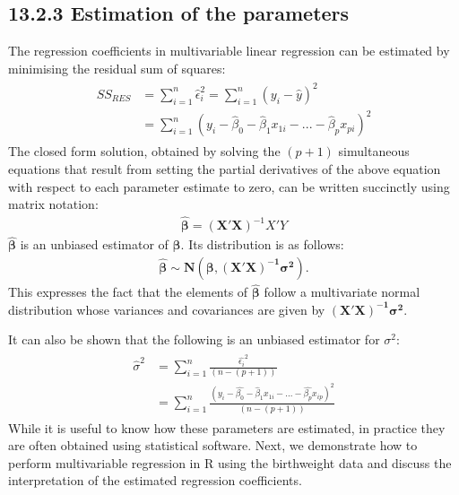 \documentclass[letterpaper,10pt,english]{jupyterBook}
\begin{document}
\subsection{13.2.3 Estimation of the parameters}
\label{\detokenize{13.c. Linear Regression II:estimation-of-the-parameters}}
\sphinxAtStartPar
The regression coefficients in multivariable linear regression can be estimated by minimising the residual sum of squares:
\begin{equation*}
\begin{split}
\begin{align}
SS_{RES} &= \sum_{i=1}^n \hat{\epsilon}_i^2 = \sum_{i=1}^n (y_i-\hat{y})^2 \\
&= \sum_{i=1}^n (y_i-\hat{\beta}_0-\hat{\beta}_1x_{1i}-...-\hat{\beta}_px_{pi})^2 
\end{align}
\end{split}
\end{equation*}
\sphinxAtStartPar
The closed form solution, obtained by solving the \((p+1)\) simultaneous equations that result from setting the partial derivatives of the above equation with respect to each parameter estimate to zero, can be written succinctly using matrix notation:
\begin{equation*}
\begin{split}
\mathbf{\hat{\beta}}= (\mathbf{X'X})^{-1}X'Y
\end{split}
\end{equation*}
\sphinxAtStartPar
\(\mathbf{\hat{\beta}}\) is an unbiased estimator of \(\mathbf{\beta}\). Its distribution is as follows:
\begin{equation*}
\begin{split}
\mathbf{\hat{\beta}} \sim \mathbf{N(\beta, (X'X)^{-1}\sigma^2)}.
\end{split}
\end{equation*}
\sphinxAtStartPar
This expresses the fact that the elements of \(\mathbf{\hat{\beta}}\) follow a multivariate normal distribution whose variances and covariances are given by \(\mathbf{(X'X)^{-1}\sigma^2}\).

\sphinxAtStartPar
It can also be shown that the following is an unbiased estimator for \(\sigma^2\):
\begin{equation*}
\begin{split}
\begin{align}
\hat{\sigma}^2 &= \sum_{i=1}^n \frac{\hat{\epsilon_i}^2}{(n-(p+1))}\\
              &=\sum_{i=1}^n \frac{(y_i - \hat{\beta_0} - \hat{\beta}_1x_{1i}- ... - \hat{\beta_p}x_{ip})^2}{(n-(p+1))}
\end{align}
\end{split}
\end{equation*}
\sphinxAtStartPar
While it is useful to know how these parameters are estimated, in practice they are often obtained using statistical software. Next, we demonstrate how to perform multivariable regression in R using the birthweight data and discuss the interpretation of the estimated regression coefficients.
\end{document}
